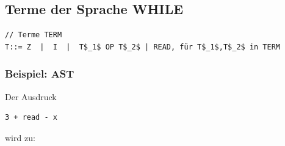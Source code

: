 \subsection{Terme der Sprache WHILE}
\begin{lstlisting}[mathescape]
// Terme TERM
T::= Z  |  I  |  T$_1$ OP T$_2$ | READ, für T$_1$,T$_2$ in TERM
\end{lstlisting}

\subsubsection*{Beispiel: AST}
Der Ausdruck
\begin{lstlisting}
3 + read - x 
\end{lstlisting}
wird zu:\\

